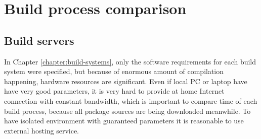 \documentclass[printmode]{mgr}
\begin{document}
\begin{landscape}





























\end{landscape}



















\chapter{Build process comparison}
\label{chapter:build-comparison}

\section{Build servers}
In Chapter \ref{chapter:build-systems}, only the software requirements for each build system were specified, but because of enormous amount of compilation happening, hardware resources are significant.
Even if local PC or laptop have have very good parameters, it is very hard to provide at home Internet connection with constant bandwidth, which is important to compare time of each build process, because all package sources are being downloaded meanwhile.
To have isolated environment with guaranteed parameters it is reasonable to use external hosting service.
\end{document}
